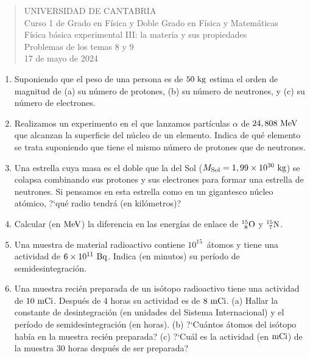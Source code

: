 \documentclass[11pt]{articulo}
\begin{document}
\begin{verse}
{\Large UNIVERSIDAD DE CANTABRIA}\\ 
\vspace*{0.5cm}
{\normalsize \rm Curso 1 de Grado en F\'isica y Doble Grado en F\'isica y Matem\'aticas}\\
{\normalsize \rm F\'isica b\'asica experimental III: la materia y sus propiedades}\\ 
{\normalsize \rm Problemas de los temas 8 y 9}\\
{\normalsize \rm 17 de mayo de 2024}\\
\end{verse} 

\vspace*{0.25cm}

\begin{enumerate}

\item Suponiendo que el peso de una persona es de $50~{\rm kg}$ estima el orden de magnitud de (a) su n\'umero de protones, (b) su n\'umero de neutrones, y (c) su n\'umero de electrones.

\item Realizamos un experimento en el que lanzamos part\'iculas $\alpha$ de $24,808~{\rm MeV}$ que alcanzan la superficie del n\'ucleo de un elemento. Indica de qu\'e elemento se trata suponiendo que tiene el mismo n\'umero de protones que de neutrones.

\item Una estrella cuya masa es el doble que la del Sol ($M_{\rm Sol} = 1,99 \times 10^{30}~{\rm kg}$) se colapsa combinando sus protones y sus electrones para formar una estrella de neutrones. Si pensamos en esta estrella como en un gigantesco n\'ucleo at\'omico, ?`qu\'e radio tendr\'a (en kil\'ometros)?

\item Calcular (en ${\rm MeV}$) la diferencia en las energ\'ias de enlace de $_{~8}^{15}{\rm O}$ y $_{~7}^{15}{\rm N}$.

\item Una muestra de material radioactivo contiene $10^{15}$~\'atomos y tiene una actividad de $6\times 10^{11}~{\rm Bq}$. Indica (en minutos) su per\'iodo de semidesintegraci\'on.

\item Una muestra reci\'en preparada de un is\'otopo radioactivo tiene una actividad de $10~{\rm mCi}$. Despu\'es de 4 horas su actividad es de $8~{\rm mCi}$. (a) Hallar la constante de desintegraci\'on (en unidades del Sistema Internacional) y el per\'iodo de semidesintegraci\'on (en horas). (b) ?`Cu\'antos \'atomos del is\'otopo hab\'ia en la muestra reci\'en preparada? (c) ?`Cu\'al es la actividad (en ${\rm mCi}$) de la muestra 30 horas despu\'es de ser preparada?


\end{enumerate}
\end{document}
